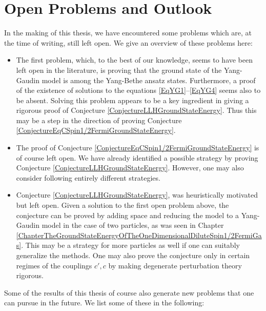 \section{Open Problems and Outlook}
 In the making of this thesis, we have encountered some problems which are, at the time of writing, still left open. We give an overview of these problems here:
 \begin{itemize}
 	\item The first problem, which, to the best of our knowledge, seems to have been left open in the literature, is proving that the ground state of the Yang-Gaudin model is among the Yang-Bethe ansatz states. Furthermore, a proof of the existence of solutions to the equations \eqref{EqYG1}--\eqref{EqYG4} seems also to be absent. Solving this problem appears to be a key ingredient in giving a rigorous proof of Conjecture \ref{ConjectureLLHGroundStateEnergy}. Thus this may be a step in the direction of proving Conjecture \ref{ConjectureEqCSpin1/2FermiGroundStateEnergy}.
 	\item The proof of Conjecture \ref{ConjectureEqCSpin1/2FermiGroundStateEnergy} is of course left open. We have already identified a possible strategy by proving Conjecture \ref{ConjectureLLHGroundStateEnergy}. However, one may also consider following entirely different strategies.
 	\item Conjecture \ref{ConjectureLLHGroundStateEnergy}, was heuristically motivated but left open. Given a solution to the first open problem above, the conjecture can be proved by adding space and reducing the model to a Yang-Gaudin model in the case of two particles, as was seen in Chapter \ref{ChapterTheGroundStateEnergyOfTheOneDimensionalDiluteSpin1/2FermiGas}. This may be a strategy for more particles as well if one can suitably generalize the methods. One may also prove the conjecture only in certain regimes of the couplings $ c',c $ by making degenerate perturbation theory rigorous.
 \end{itemize}
Some of the results of this thesis of course also generate new problems that one can pursue in the future. We list some of these in the following:
